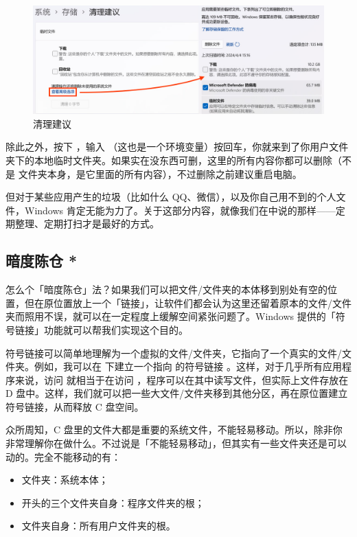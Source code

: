 {\begin{figure}[htb!]
  \centering
  \includegraphics[width=.75\textwidth]{assets/advanced/Clean_Suggestion.jpg}
  \caption{清理建议}
  \label{fig:Clean_Suggestion}
\end{figure}

除此之外，按下 ，输入 （这也是一个环境变量）按回车，你就来到了你用户文件夹下的本地临时文件夹。如果实在没东西可删，这里的所有内容你都可以删除（不是  文件夹本身，是它里面的所有内容），不过删除之前建议重启电脑。

但对于某些应用产生的垃圾（比如什么 QQ、微信），以及你自己用不到的个人文件，Windows 肯定无能为力了。关于这部分内容，就像我们在中说的那样——定期整理、定期打扫才是最好的方式。

\subsection{暗度陈仓 *}

怎么个「暗度陈仓」法？如果我们可以把文件/文件夹的本体移到别处有空的位置，但在原位置放上一个「链接」，让软件们都会认为这里还留着原本的文件/文件夹而照用不误，就可以在一定程度上缓解空间紧张问题了。Windows 提供的「符号链接」功能就可以帮我们实现这个目的。

符号链接可以简单地理解为一个虚拟的文件/文件夹，它指向了一个真实的文件/文件夹。例如，我可以在  下建立一个指向  的符号链接 。这样，对于几乎所有应用程序来说，访问  就相当于在访问 ，程序可以在其中读写文件，但实际上文件存放在 D 盘中。这样，我们就可以把一些大文件/文件夹移到其他分区，再在原位置建立符号链接，从而释放 C 盘空间。

众所周知，C 盘里的文件大都是重要的系统文件，不能轻易移动。所以，除非你非常理解你在做什么。不过说是「不能轻易移动」，但其实有一些文件夹还是可以动的。完全不能移动的有：

\begin{itemize}
  \item {} 文件夹：系统本体；
  \item {} 开头的三个文件夹自身：程序文件夹的根；
  \item {} 文件夹自身：所有用户文件夹的根。
\end{itemize}

}
